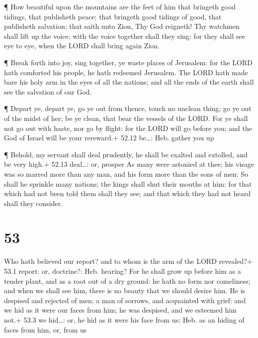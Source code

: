  ¶ How beautiful upon the mountains are the feet of him that
bringeth good tidings, that publisheth peace; that bringeth good tidings
of good, that publisheth salvation; that saith unto Zion, Thy God
reigneth!  Thy watchmen shall lift up the voice; with the
voice together shall they sing: for they shall see eye to eye, when the
LORD shall bring again Zion.

 ¶ Break forth into joy, sing together, ye waste places of
Jerusalem: for the LORD hath comforted his people, he hath redeemed
Jerusalem.  The LORD hath made bare his holy arm in the
eyes of all the nations; and all the ends of the earth shall see the
salvation of our God.

 ¶ Depart ye, depart ye, go ye out from thence, touch no
unclean thing; go ye out of the midst of her; be ye clean, that bear the
vessels of the LORD.  For ye shall not go out with haste,
nor go by flight: for the LORD will go before you; and the God of Israel
will be your rereward.+ 52.12 be\ldots: Heb. gather you up

 ¶ Behold, my servant shall deal prudently, he shall be
exalted and extolled, and be very high.+ 52.13 deal\ldots: or, prosper
 As many were astonied at thee; his visage was so marred
more than any man, and his form more than the sons of men: 
So shall he sprinkle many nations; the kings shall shut their mouths at
him: for that which had not been told them shall they see; and that
which they had not heard shall they consider.

\hypertarget{section-52}{%
\section{53}\label{section-52}}

 Who hath believed our report? and to whom is the arm of the
LORD revealed?+ 53.1 report: or, doctrine?: Heb. hearing? 
For he shall grow up before him as a tender plant, and as a root out of
a dry ground: he hath no form nor comeliness; and when we shall see him,
there is no beauty that we should desire him.  He is
despised and rejected of men; a man of sorrows, and acquainted with
grief: and we hid as it were our faces from him; he was despised, and we
esteemed him not.+ 53.3 we hid\ldots: or, he hid as it were his face
from us: Heb. as an hiding of faces from him, or, from us

